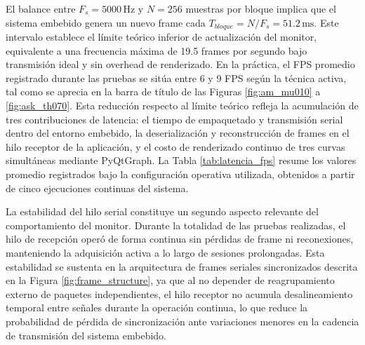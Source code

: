 El balance entre $F_s = 5000\,\text{Hz}$ y $N = 256$ muestras por bloque implica que el sistema embebido genera un nuevo frame cada $T_{bloque} = N / F_s = 51.2\,\text{ms}$. Este intervalo establece el límite teórico inferior de actualización del monitor, equivalente a una frecuencia máxima de 19.5 frames por segundo bajo transmisión ideal y sin overhead de renderizado. En la práctica, el FPS promedio registrado durante las pruebas se sitúa entre 6 y 9 FPS según la técnica activa, tal como se aprecia en la barra de título de las Figuras \ref{fig:am_mu010} a \ref{fig:ask_th070}. Esta reducción respecto al límite teórico refleja la acumulación de tres contribuciones de latencia: el tiempo de empaquetado y transmisión serial dentro del entorno embebido, la deserialización y reconstrucción de frames en el hilo receptor de la aplicación, y el costo de renderizado continuo de tres curvas simultáneas mediante PyQtGraph. La Tabla \ref{tab:latencia_fps} resume los valores promedio registrados bajo la configuración operativa utilizada, obtenidos a partir de cinco ejecuciones continuas del sistema.

\begin{table}[H]
\centering
\caption{Latencia aproximada del sistema de monitoreo bajo $F_s = 5000\,\text{Hz}$ y $N = 256$.}
\label{tab:latencia_fps}
\end{table}


La estabilidad del hilo serial constituye un segundo aspecto relevante del comportamiento del monitor. Durante la totalidad de las pruebas realizadas, el hilo de recepción operó de forma continua sin pérdidas de frame ni reconexiones, manteniendo la adquisición activa a lo largo de sesiones prolongadas. Esta estabilidad se sustenta en la arquitectura de frames seriales sincronizados descrita en la Figura \ref{fig:frame_structure}, ya que al no depender de reagrupamiento externo de paquetes independientes, el hilo receptor no acumula desalineamiento temporal entre señales durante la operación continua, lo que reduce la probabilidad de pérdida de sincronización ante variaciones menores en la cadencia de transmisión del sistema embebido.

